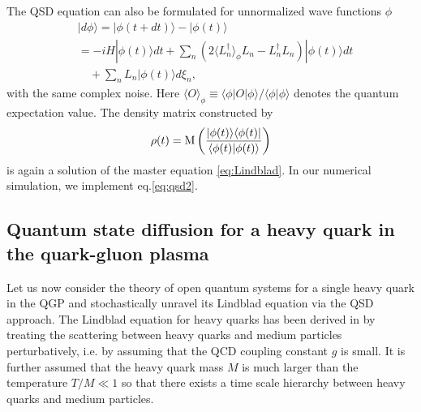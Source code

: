 \documentclass[prd,11pt, amsmath, amsymb, aps, reprint, tightenlines, nofootinbib, longbibliography, abbrv, preprintnumbers]{revtex4-1}
\begin{document}
The QSD equation can also be formulated for unnormalized wave functions $\phi$
\begin{align}
\label{eq:qsd2}
& |d\phi\rangle = |\phi(t+dt)\rangle - |\phi(t)\rangle \nonumber\\
&= -i H|\phi(t)\rangle dt
+\sum_n\left(
2\langle L_n^{\dagger}\rangle_{\phi} L_n
- L_n^{\dagger}L_n\right) |\phi(t)\rangle dt \nonumber\\
& \quad +\sum_n L_n |\phi(t)\rangle d\xi_n,
\end{align}
with the same complex noise.
Here $\langle O \rangle_{\phi} \equiv \langle\phi| O |\phi\rangle/\langle\phi|\phi\rangle$ denotes the quantum expectation value. The density matrix constructed by
\begin{align}
\rho(t)= {\rm M}\left(\frac{|\phi(t)\rangle\langle\phi(t)|}{\langle\phi(t)|\phi(t)\rangle}\right)
\end{align}
is again a solution of the master equation \eqref{eq:Lindblad}.
In our numerical simulation, we implement eq.\eqref{eq:qsd2}.


\subsection{Quantum state diffusion for a heavy quark in the quark-gluon plasma}
Let us now consider the theory of open quantum systems for a single heavy quark in the QGP and stochastically unravel its Lindblad equation via the QSD approach.
The Lindblad equation for heavy quarks has been derived in
\cite{Akamatsu:2014qsa} by treating the scattering between heavy quarks
and medium particles perturbatively, i.e. by assuming that the QCD coupling constant $g$ is small.
It is further assumed that the heavy quark mass $M$ is much larger than the temperature $T/M\ll 1$ so that there exists a time scale hierarchy between heavy quarks and medium particles. 
\end{document}
